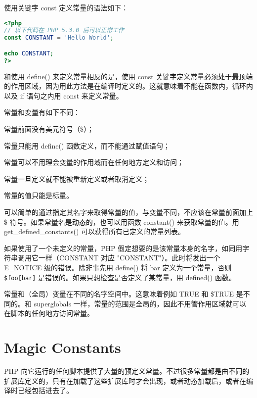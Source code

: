 使用关键字 const 定义常量的语法如下：

\begin{lstlisting}[language=PHP]
<?php
// 以下代码在 PHP 5.3.0 后可以正常工作
const CONSTANT = 'Hello World';

echo CONSTANT;
?>
\end{lstlisting}



和使用 define() 来定义常量相反的是，使用 const 关键字定义常量必须处于最顶端的作用区域，因为用此方法是在编译时定义的。这就意味着不能在函数内，循环内以及 if 语句之内用 const 来定义常量。

常量和变量有如下不同：

\begin{compactitem}
\item 常量前面没有美元符号（\$）；
\item 常量只能用 define() 函数定义，而不能通过赋值语句；
\item 常量可以不用理会变量的作用域而在任何地方定义和访问；
\item 常量一旦定义就不能被重新定义或者取消定义；
\item 常量的值只能是标量。
\end{compactitem}


可以简单的通过指定其名字来取得常量的值，与变量不同，不应该在常量前面加上 \$ 符号。如果常量名是动态的，也可以用函数 constant() 来获取常量的值。用 get\_defined\_constants() 可以获得所有已定义的常量列表。

如果使用了一个未定义的常量，PHP 假定想要的是该常量本身的名字，如同用字符串调用它一样（CONSTANT 对应 "CONSTANT"）。此时将发出一个 E\_NOTICE 级的错误。除非事先用 define() 将 bar 定义为一个常量，否则\texttt{\$foo[bar]} 是错误的。如果只想检查是否定义了某常量，用 defined() 函数。



常量和（全局）变量在不同的名字空间中。这意味着例如 TRUE 和 \$TRUE 是不同的。和 superglobals 一样，常量的范围是全局的，因此不用管作用区域就可以在脚本的任何地方访问常量。














\section{Magic Constants}


PHP 向它运行的任何脚本提供了大量的预定义常量。不过很多常量都是由不同的扩展库定义的，只有在加载了这些扩展库时才会出现，或者动态加载后，或者在编译时已经包括进去了。

